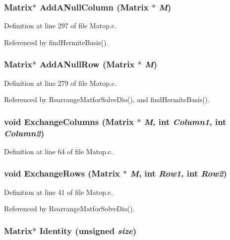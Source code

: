 \subsubsection{\setlength{\rightskip}{0pt plus 5cm}Matrix$\ast$ Add\-ANull\-Column (Matrix $\ast$ {\em M})}\label{Matop_8c_a13}




Definition at line 297 of file Matop.c.

Referenced by find\-Hermite\-Basis().

\subsubsection{\setlength{\rightskip}{0pt plus 5cm}Matrix$\ast$ Add\-ANull\-Row (Matrix $\ast$ {\em M})}\label{Matop_8c_a12}




Definition at line 279 of file Matop.c.

Referenced by Rearrange\-Matfor\-Solve\-Dio(), and find\-Hermite\-Basis().

\subsubsection{\setlength{\rightskip}{0pt plus 5cm}void Exchange\-Columns (Matrix $\ast$ {\em M}, int {\em Column1}, int {\em Column2})}\label{Matop_8c_a3}




Definition at line 64 of file Matop.c.
\subsubsection{\setlength{\rightskip}{0pt plus 5cm}void Exchange\-Rows (Matrix $\ast$ {\em M}, int {\em Row1}, int {\em Row2})}\label{Matop_8c_a2}




Definition at line 41 of file Matop.c.

Referenced by Rearrange\-Matfor\-Solve\-Dio().

\subsubsection{\setlength{\rightskip}{0pt plus 5cm}Matrix$\ast$ Identity (unsigned {\em size})}\label{Matop_8c_a1}




